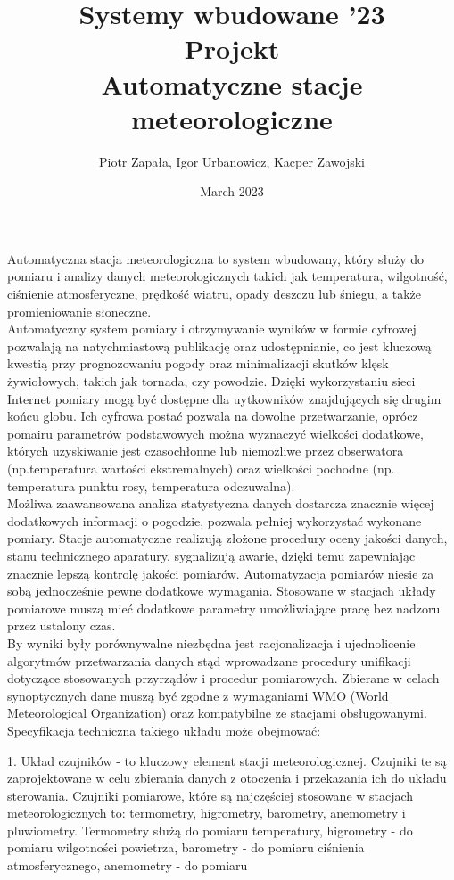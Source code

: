 \documentclass{article}
\title{Systemy wbudowane '23 \\ Projekt \\ Automatyczne stacje meteorologiczne}
\author{Piotr Zapała, Igor Urbanowicz, Kacper Zawojski}
\date{March 2023}
\begin{document}
\maketitle
\begin{center}
    \large Automatyczna stacja meteorologiczna to system wbudowany, który służy do pomiaru i analizy danych meteorologicznych takich jak temperatura, wilgotność, ciśnienie atmosferyczne, prędkość wiatru, opady deszczu lub śniegu, a także promieniowanie słoneczne.
    \\[0.5cm]
    Automatyczny system pomiary i otrzymywanie wyników w formie cyfrowej pozwalają na 
    natychmiastową publikację oraz udostępnianie, co jest kluczową kwestią przy 
    prognozowaniu pogody oraz minimalizacji skutków klęsk żywiołowych, takich jak tornada, czy powodzie.
    Dzięki wykorzystaniu sieci Internet pomiary mogą być dostępne dla uytkowników znajdujących się drugim
    końcu globu. Ich cyfrowa postać pozwala na dowolne przetwarzanie, oprócz pomairu parametrów podstawowych
    można wyznaczyć wielkości dodatkowe, których uzyskiwanie jest czasochłonne lub niemożliwe przez obserwatora (np.temperatura wartości ekstremalnych) oraz wielkości pochodne (np. temperatura punktu rosy, temperatura odczuwalna).
    \\[0.5cm]
    Możliwa zaawansowana analiza statystyczna danych dostarcza znacznie więcej 
    dodatkowych informacji o pogodzie, pozwala pełniej wykorzystać wykonane pomiary. Stacje automatyczne 
    realizują złożone procedury oceny jakości danych, stanu technicznego aparatury, sygnalizują awarie, 
    dzięki temu zapewniając znacznie lepszą kontrolę jakości pomiarów. Automatyzacja pomiarów niesie za sobą 
    jednocześnie pewne dodatkowe wymagania. Stosowane w stacjach układy pomiarowe muszą mieć dodatkowe 
    parametry umożliwiające pracę bez nadzoru przez ustalony czas.
    \\[0.5cm]
    By wyniki były porównywalne niezbędna jest racjonalizacja i ujednolicenie algorytmów przetwarzania danych stąd wprowadzane procedury unifikacji dotyczące stosowanych przyrządów i procedur pomiarowych. Zbierane w celach synoptycznych dane muszą być 
    zgodne z wymaganiami WMO (World Meteorological Organization) oraz kompatybilne ze stacjami obsługowanymi.
    \\[0.5cm]
    \newpage
    Specyfikacja techniczna takiego układu może obejmować:
    \begin{flushleft}
        1. Układ czujników - to kluczowy element stacji meteorologicznej. Czujniki te są zaprojektowane w celu zbierania danych z otoczenia i przekazania ich do układu sterowania. Czujniki pomiarowe, które są najczęściej stosowane w stacjach meteorologicznych to: termometry, higrometry, barometry, anemometry i pluwiometry. Termometry służą do pomiaru temperatury, higrometry - do pomiaru wilgotności powietrza, barometry - do pomiaru ciśnienia atmosferycznego, anemometry - do pomiaru 

\end{flushleft}
\end{center}
\end{document}

